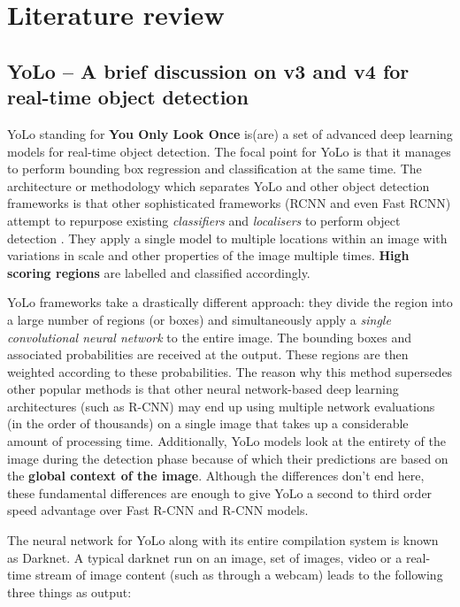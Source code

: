 \chapter{Literature review} \label{chapter2}

\section{YoLo – A brief discussion on v3 and v4 for real-time object detection} \label{brief_discuss}
YoLo standing for \textbf{You Only Look Once} is(are) a set of advanced deep learning models for real-time object detection. The focal point for YoLo is that it manages to perform bounding box regression and classification at the same time. The architecture or methodology which separates YoLo and other object detection frameworks is that other sophisticated frameworks (RCNN and even Fast RCNN) attempt to repurpose existing \textit{classifiers} and \textit{localisers} to perform object detection \cite{Srivastava2021}. They apply a single model to multiple locations within an image with variations in scale and other properties of the image multiple times. \textbf{High scoring regions} are labelled and classified accordingly. \par

YoLo frameworks take a drastically different approach: they divide the region into a large number of regions (or boxes) and simultaneously apply a \textit{single convolutional neural network} to the entire image. The bounding boxes and associated probabilities are received at the output. These regions are then weighted according to these probabilities. The reason why this method supersedes other popular methods is that other neural network-based deep learning architectures (such as R-CNN) may end up using multiple network evaluations (in the order of thousands) on a single image that takes up a considerable amount of processing time. Additionally, YoLo models look at the entirety of the image during the detection phase because of which their predictions are based on the \textbf{global context of the image}. Although the differences don’t end here, these fundamental differences are enough to give YoLo a second to third order speed advantage over Fast R-CNN and R-CNN models. \par

The neural network for YoLo along with its entire compilation system is known as Darknet. A typical darknet run on an image, set of images, video or a real-time stream of image content (such as through a webcam) leads to the following three things as output:

